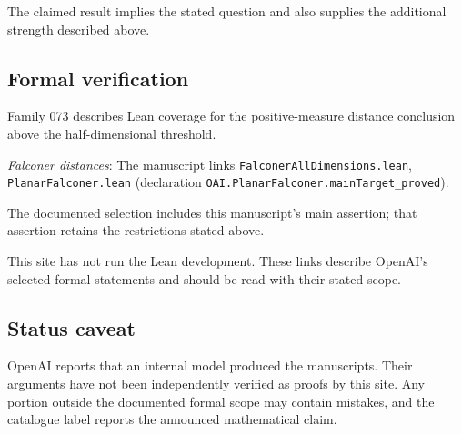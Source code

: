\documentclass[11pt]{article}
\begin{document}
The claimed result implies the stated question and also supplies the additional strength described above.

\subsection{Formal verification}
Family 073 describes Lean coverage for the positive-measure distance conclusion above the half-dimensional threshold.

\textit{Falconer distances}: The manuscript links \texttt{FalconerAllDimensions.lean}, \texttt{PlanarFalconer.lean} (declaration \texttt{OAI.PlanarFalconer.mainTarget\_proved}).

The documented selection includes this manuscript’s main assertion; that assertion retains the restrictions stated above.

This site has not run the Lean development. These links describe OpenAI’s selected formal statements and should be read with their stated scope.

\subsection{Status caveat}
OpenAI reports that an internal model produced the manuscripts. Their arguments have not been independently verified as proofs by this site. Any portion outside the documented formal scope may contain mistakes, and the catalogue label reports the announced mathematical claim.
\end{document}
